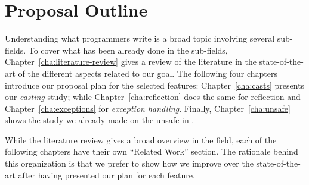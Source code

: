 \section{Proposal Outline}

Understanding what programmers write is a broad topic involving several sub-fields.
To cover what has been already done in the sub-fields, Chapter~\ref{cha:literature-review} gives a review of the literature in the state-of-the-art of the different aspects related to our goal. 
The following four chapters introduce our proposal plan for the selected features:
Chapter~\ref{cha:casts} presents our \emph{casting} study;
while Chapter~\ref{cha:reflection} does the same for reflection and
Chapter~\ref{cha:exceptions} for \emph{exception handling}.
Finally, Chapter~\ref{cha:unsafe} shows the study we already made on the unsafe \api{} in \java{}.

While the literature review gives a broad overview in the field,
each of the following chapters have their own ``Related Work'' section.
The rationale behind this organization is that we prefer to show how we improve over the state-of-the-art after having presented our plan for each feature.

